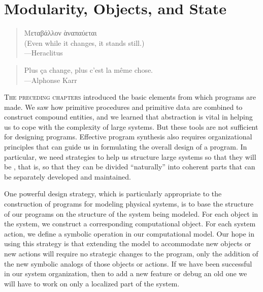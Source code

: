 \chapter{Modularity, Objects, and State}
\label{Chapter 3}


\begin{quote}
Mεταβάλλον ὰναπαύεται\\
(Even while it changes, it stands still.)\\
---Heraclitus
\end{quote}

\begin{quote}
Plus \c{c}a change, plus c'est la m\^{e}me chose.\\
---Alphonse Karr
\end{quote}


\noindent
\lettrine{T}{he preceding chapters} introduced the basic elements from which programs are
made.  We saw how primitive procedures and primitive data are combined to
construct compound entities, and we learned that abstraction is vital in
helping us to cope with the complexity of large systems.  But these tools are
not sufficient for designing programs.  Effective program synthesis also
requires organizational principles that can guide us in formulating the overall
design of a program.  In particular, we need strategies to help us structure
large systems so that they will be , that is, so that they can
be divided ``naturally'' into coherent parts that can be separately developed
and maintained.

One powerful design strategy, which is particularly appropriate to the
construction of programs for modeling physical systems, is to base the
structure of our programs on the structure of the system being modeled.  For
each object in the system, we construct a corresponding computational object.
For each system action, we define a symbolic operation in our computational
model.  Our hope in using this strategy is that extending the model to
accommodate new objects or new actions will require no strategic changes to the
program, only the addition of the new symbolic analogs of those objects or
actions.  If we have been successful in our system organization, then to add a
new feature or debug an old one we will have to work on only a localized part
of the system.

